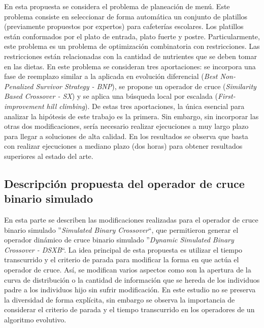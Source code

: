 En esta propuesta se considera el problema de planeación de menú.
%
Este problema consiste en seleccionar de forma automática un conjunto de platillos (previamente propuestos por expertos) 
para cafeterías escolares.
%
Los platillos están conformados por el plato de entrada, plato fuerte y postre. 
%
Particularmente, este problema es un problema de optimización combinatoria con restricciones.
%
Las restricciones están relacionadas con la cantidad de nutrientes que se deben tomar en las dietas.
%
En este problema se consideran tres aportaciones: se incorpora una fase de reemplazo similar a la aplicada en evolución 
diferencial (\textit{Best Non-Penalized Survivor Strategy - BNP}), se propone un operador de cruce 
(\textit{Similarity Based Crossover - SX}) y se aplica una búsqueda local por escalada (\textit{First-improvement hill climbing}).
%
De estas tres aportaciones, la única esencial para analizar la hipótesis de este trabajo es la primera.
%
Sin embargo, sin incorporar las otras dos modificaciones, sería necesario realizar ejecuciones a muy largo plazo para llegar
a soluciones de alta calidad.
%
En los resultados se observa que basta con realizar ejecuciones a mediano plazo (dos horas) para obtener resultados 
superiores al estado del arte.

\subsection{Descripción propuesta del operador de cruce binario simulado}

En esta parte se describen las modificaciones realizadas para el operador de cruce binario simulado 
''\textit{Simulated Binary Crossover}``, que permitieron generar el operador dinámico de cruce binario simulado 
''\textit{Dynamic Simulated Binary Crossover - DSXB}``.
%
La idea principal de esta propuesta es utilizar el tiempo transcurrido y el criterio de parada para modificar la forma
en que actúa el operador de cruce.
%
Así, se modifican varios aspectos como son la apertura de la curva de distribución o la cantidad de información que se hereda 
de los individuos padre a los individuos hijo sin sufrir modificación.
%
En este estudio no se preserva la diversidad de forma explícita, sin embargo se observa la importancia de considerar el 
criterio de parada y el tiempo transcurrido en los operadores de un algoritmo evolutivo.

